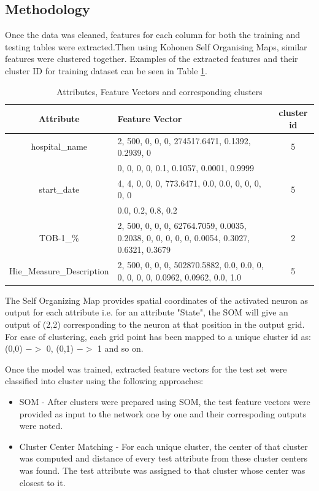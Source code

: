 \documentclass[conference]{IEEEtran}
\begin{document}
\subsection{Methodology}
Once the data was cleaned, features for each column for both the training and testing tables were extracted.Then using Kohonen Self Organising Maps, similar features were clustered together. Examples of the extracted features and their cluster ID for training dataset can be seen in Table \ref{FV}.

\begin{table}[h]
\centering
\caption{Attributes, Feature Vectors and corresponding clusters}
\begin{tabular}{|c|p{5cm}|c|}
\hline
Attribute & Feature Vector & cluster id\\
\hline \hline
hospital\_name & 2, 500, 0, 0, 0, 274517.6471, 0.1392, 0.2939, 0 & 5\\
& 0, 0, 0, 0, 0.1, 0.1057, 0.0001, 0.9999 &\\
start\_date & 4, 4, 0, 0, 0, 773.6471, 0.0, 0.0, 0, 0, 0, 0, 0 & 5\\
& 0.0, 0.2, 0.8, 0.2 &\\ 
TOB-1\_$\%$ & 2, 500, 0, 0, 0, 62764.7059, 0.0035, 0.2038, 0, 0, 0, 0, 0, 0.0054, 0.3027, 0.6321, 0.3679 & 2\\
Hie\_Measure\_Description & 2, 500, 0, 0, 0, 502870.5882, 0.0, 0.0, 0, 0, 0, 0, 0, 0.0962, 0.0962, 0.0, 1.0 & 5\\
\hline
\end{tabular}
\label{FV}
\end{table}

The Self Organizing Map provides spatial coordinates of the activated neuron as output for each attribute i.e. for an attribute "State", the SOM will give an output of (2,2) corresponding to the neuron at that position in the output grid. For ease of clustering, each grid point has been mapped to a unique cluster id as: (0,0) $->$ 0, (0,1) $->$ 1 and so on.

Once the model was trained, extracted feature vectors for the test set were classified into cluster using the following approaches:
\begin{itemize}
\item SOM - After clusters were prepared using SOM, the test feature vectors were provided as input to the network one by one and their correspoding outputs were noted. 
\item Cluster Center Matching - For each unique cluster, the center of that cluster was computed and distance of every test attribute from these cluster centers was found. The test attribute was assigned to that cluster whose center was closest to it. 
\end{itemize} 
\end{document}
